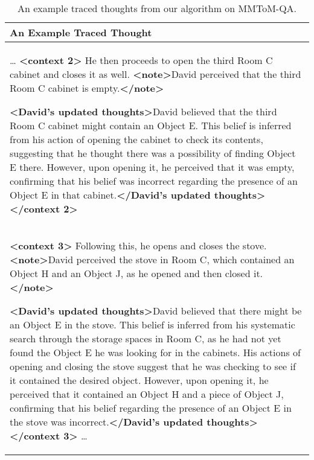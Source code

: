 {\renewcommand{\arraystretch}{1.0}
\begin{table}[t!]
    \centering
    \small
    \begin{tabular}{p{}}
    \toprule
        An Example Traced Thought                    \\
        \midrule



\ldots
\textbf{<context 2>}
He then proceeds to open the third Room C cabinet and closes it as well.
\textbf{<note>}David perceived that the third Room C cabinet is empty.\textbf{</note>}

\textbf{<David's updated thoughts>}David believed that the third Room C cabinet might contain an Object E. This belief is inferred from his action of opening the cabinet to check its contents, suggesting that he thought there was a possibility of finding Object E there. However, upon opening it, he perceived that it was empty, confirming that his belief was incorrect regarding
the presence of an Object E in that cabinet.\textbf{</David's updated thoughts>}
\textbf{</context 2>}
\\
\textbf{<context 3>}
Following this, he opens and closes the stove.
\textbf{<note>}David perceived the stove in Room C, which contained an Object H and an Object J, as he opened and then closed it.\textbf{</note>}

\textbf{<David's updated thoughts>}David believed that there might be an Object E in the stove. This belief is inferred from his systematic search through the storage spaces in Room C, as he had not yet found the Object E he was looking for in the cabinets. His actions of opening and closing the stove suggest that he was checking to see if it contained the desired object.
However, upon opening it, he perceived that it contained an Object H and a piece of Object J, confirming that his belief regarding the presence of an Object E in the stove was incorrect.\textbf{</David's updated thoughts>}
\textbf{</context 3>}
\ldots \\



        \bottomrule
    \end{tabular}
    \vspace{-0.5em}
    \caption{
        An example traced thoughts from our \tracing algorithm on MMToM-QA.
    }
    \vspace{-1em}
    \label{tab:example_trace}
\end{table}}
